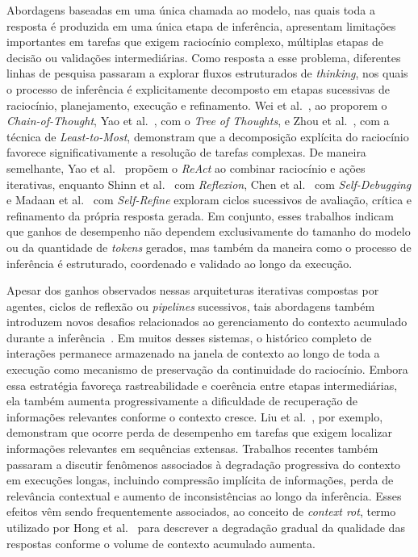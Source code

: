 \documentclass[a4paper,10pt,twocolumn]{article}
\begin{document}
Abordagens baseadas em uma única chamada ao modelo, nas quais toda a resposta é produzida em uma única etapa de inferência, apresentam limitações importantes em tarefas que exigem raciocínio complexo, múltiplas etapas de decisão ou validações intermediárias. Como resposta a esse problema, diferentes linhas de pesquisa passaram a explorar fluxos estruturados de \textit{thinking}, nos quais o processo de inferência é explicitamente decomposto em etapas sucessivas de raciocínio, planejamento, execução e refinamento. Wei et al.~\cite{wei2022chain}, ao proporem o \textit{Chain-of-Thought}, Yao et al.~\cite{yao2023tree}, com o \textit{Tree of Thoughts}, e Zhou et al.~\cite{zhou2022least}, com a técnica de \textit{Least-to-Most}, demonstram que a decomposição explícita do raciocínio favorece significativamente a resolução de tarefas complexas. De maneira semelhante, Yao et al.~\cite{yao2022react} propõem o \textit{ReAct} ao combinar raciocínio e ações iterativas, enquanto Shinn et al.~\cite{shinn2023reflexion} com \textit{Reflexion}, Chen et al.~\cite{chen2023selfdebug} com \textit{Self-Debugging} e Madaan et al.~\cite{madaan2023selfrefine} com \textit{Self-Refine} exploram ciclos sucessivos de avaliação, crítica e refinamento da própria resposta gerada. Em conjunto, esses trabalhos indicam que ganhos de desempenho não dependem exclusivamente do tamanho do modelo ou da quantidade de \textit{tokens} gerados, mas também da maneira como o processo de inferência é estruturado, coordenado e validado ao longo da execução.

Apesar dos ganhos observados nessas arquiteturas iterativas compostas por agentes, ciclos de reflexão ou \textit{pipelines} sucessivos, tais abordagens também introduzem novos desafios relacionados ao gerenciamento do contexto acumulado durante a inferência~\cite{liu2023lost, hong2025context}. Em muitos desses sistemas, o histórico completo de interações permanece armazenado na janela de contexto ao longo de toda a execução como mecanismo de preservação da continuidade do raciocínio. Embora essa estratégia favoreça rastreabilidade e coerência entre etapas intermediárias, ela também aumenta progressivamente a dificuldade de recuperação de informações relevantes conforme o contexto cresce. Liu et al.~\cite{liu2023lost}, por exemplo, demonstram que ocorre perda de desempenho em tarefas que exigem localizar informações relevantes em sequências extensas. Trabalhos recentes também passaram a discutir fenômenos associados à degradação progressiva do contexto em execuções longas, incluindo compressão implícita de informações, perda de relevância contextual e aumento de inconsistências ao longo da inferência. Esses efeitos vêm sendo frequentemente associados, ao conceito de \textit{context rot}, termo utilizado por Hong et al.~\cite{hong2025context} para descrever a degradação gradual da qualidade das respostas conforme o volume de contexto acumulado aumenta.
\end{document}
